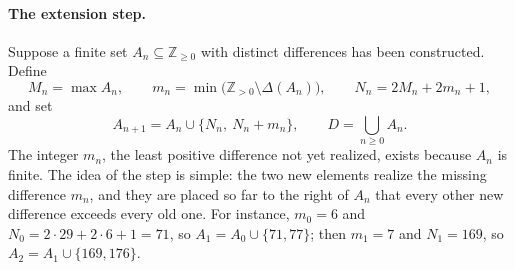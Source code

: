 \documentclass[12pt]{article}
\theoremstyle{plain}
\theoremstyle{definition}
\newcommand{\Z}{\mathbb{Z}}
\begin{document}
\paragraph{The extension step.}
Suppose a finite set $A_n\subseteq\Z_{\geq0}$ with distinct differences
has been constructed.  Define
\begin{equation}\label{eq:parameters}
 M_n=\max A_n,\qquad
 m_n=\min\bigl(\Z_{>0}\setminus\Delta(A_n)\bigr),\qquad
 N_n=2M_n+2m_n+1,
\end{equation}
and set
\begin{equation}\label{eq:recursion}
 A_{n+1}=A_n\cup\{N_n,\ N_n+m_n\},\qquad
 D=\bigcup_{n\geq0}A_n.
\end{equation}
The integer $m_n$, the least positive difference not yet realized,
exists because $A_n$ is finite.  The idea of the step is simple: the two
new elements realize the missing difference $m_n$, and they are placed
so far to the right of $A_n$ that every other new difference exceeds
every old one.  For instance, $m_0=6$ and $N_0=2\cdot29+2\cdot6+1=71$,
so $A_1=A_0\cup\{71,77\}$; then $m_1=7$ and $N_1=169$, so
$A_2=A_1\cup\{169,176\}$.
\end{document}
